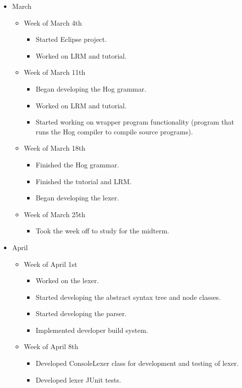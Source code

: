 \documentclass{report}
\begin{document}
\begin{itemize}
\item[] March
\begin{itemize}
\item[] Week of March 4th
\begin{itemize}
\item Started Eclipse project.
\item Worked on LRM and tutorial.
\end{itemize} %
\item[] Week of March 11th
\begin{itemize}
\item Began developing the Hog grammar.
\item Worked on LRM and tutorial.
\item Started working on wrapper program functionality (program that runs the
Hog compiler to compile source programs).
\end{itemize} %
\item[] Week of March 18th
\begin{itemize}
\item Finished the Hog grammar.
\item Finished the tutorial and LRM.
\item Began developing the lexer.
\end{itemize}
\item[] Week of March 25th
\begin{itemize}
\item Took the week off to study for the midterm.
\end{itemize}
\end{itemize} %
\item[] April
\begin{itemize}
\item[] Week of April 1st
\begin{itemize}
\item Worked on the lexer.
\item Started developing the abstract syntax tree and node classes.
\item Started developing the parser.
\item Implemented developer build system.
\end{itemize} 
\item[] Week of April 8th
\begin{itemize}
\item Developed ConsoleLexer class for development and testing of lexer. 
\item Developed lexer JUnit tests. 

\end{itemize}
\end{itemize}
\end{itemize}
\end{document}
